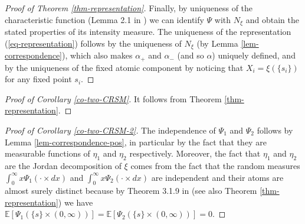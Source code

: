 \documentclass{article}
\theoremstyle{plain}
\theoremstyle{remark}
\begin{document}
\begin{proof}[Proof of Theorem \ref{thm-representation}]
	Finally, by uniqueness of the characteristic function (Lemma 2.1 in \cite{RajRos}) we can identify $\Psi$ with $N_{\xi}$ and obtain the stated properties of its intensity measure. The uniqueness of the representation (\ref{eq-representation}) follows by the uniqueness of $N_\xi$ (by Lemma \ref{lem-correspondence}), which also makes $\alpha_+$ and $\alpha_-$ (and so $\alpha$) uniquely defined, and by the uniqueness of the fixed atomic component by noticing that $X_i=\xi(\{s_i\})$ for any fixed point $s_i$.
\end{proof}





\begin{proof}[Proof of Corollary \ref{co-two-CRSM}]
	It follows from Theorem \ref{thm-representation}.
\end{proof}


\begin{proof}[Proof of Corollary \ref{co-two-CRSM-2}]
	The independence of $\Psi_1$ and $\Psi_2$ follows by Lemma \ref{lem-correspondence-pos}, in particular by the fact that they are measurable functions of $\eta_1$ and $\eta_2$ respectively. Moreover, the fact that $\eta_1$ and $\eta_2$ are the Jordan decomposition of $\xi$ comes from the fact that the random measures $\int_{0}^{\infty}x\Psi_1(\cdot\times dx)$ and $\int_{0}^{\infty}x\Psi_2(\cdot\times dx)$ are independent and their atoms are almost surely distinct because by Theorem 3.1.9 in \cite{Kallenberg2} (see also Theorem \ref{thm-representation}) we have $\mathbb{E}[\Psi_1(\{s\}\times (0,\infty))]=\mathbb{E}[\Psi_2(\{s\}\times (0,\infty))]=0$.
\end{proof}
\end{document}
